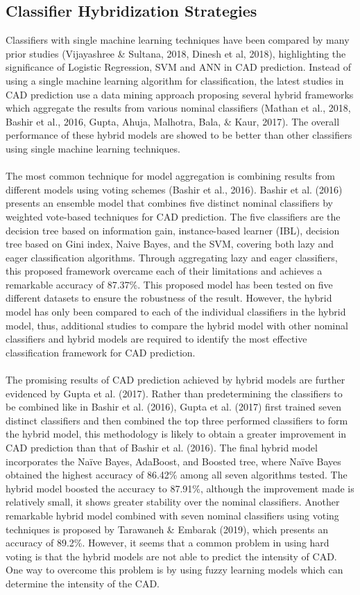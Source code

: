 \documentclass[a4paper, 12pt]{article}
\begin{document}
    \subsection{Classifier Hybridization Strategies} \label{Hybrid_strategy}
    Classifiers with single machine learning techniques have been compared by many prior studies (Vijayashree \& Sultana, 2018, Dinesh et al, 2018), highlighting the significance of Logistic Regression, SVM and ANN in CAD prediction. Instead of using a single machine learning algorithm for classification, the latest studies in CAD prediction use a data mining approach proposing several hybrid frameworks which aggregate the results from various nominal classifiers (Mathan et al., 2018, Bashir et al., 2016, Gupta, Ahuja, Malhotra, Bala, \& Kaur, 2017). The overall performance of these hybrid models are showed to be better than other classifiers using single machine learning techniques.
    \\\\
    The most common technique for model aggregation is combining results from different models using voting schemes (Bashir et al., 2016). Bashir et al. (2016) presents an ensemble model that combines five distinct nominal classifiers by weighted vote-based techniques for CAD prediction. The five classifiers are the decision tree based on information gain, instance-based learner (IBL), decision tree based on Gini index, Naive Bayes, and the SVM, covering both lazy and eager classification algorithms. Through aggregating lazy and eager classifiers, this proposed framework overcame each of their limitations and achieves a remarkable accuracy of 87.37\%. This proposed model has been tested on five different datasets to ensure the robustness of the result. However, the hybrid model has only been compared to each of the individual classifiers in the hybrid model, thus, additional studies to compare the hybrid model with other nominal classifiers and hybrid models are required to identify the most effective classification framework for CAD prediction. 
    \\\\
    The promising results of CAD prediction achieved by hybrid models are further evidenced by Gupta et al. (2017). Rather than predetermining the classifiers to be combined like in Bashir et al. (2016), Gupta et al. (2017) first trained seven distinct classifiers and then combined the top three performed classifiers to form the hybrid model, this methodology is likely to obtain a greater improvement in CAD prediction than that of Bashir et al. (2016). The final hybrid model incorporates the Naïve Bayes, AdaBoost, and Boosted tree, where Naïve Bayes obtained the highest accuracy of 86.42\% among all seven algorithms tested. The hybrid model boosted the accuracy to 87.91\%, although the improvement made is relatively small, it shows greater stability over the nominal classifiers. Another remarkable hybrid model combined with seven nominal classifiers using voting techniques is proposed by Tarawaneh \& Embarak (2019), which presents an accuracy of 89.2\%. However, it seems that a common problem in using hard voting is that the hybrid models are not able to predict the intensity of CAD. One way to overcome this problem is by using fuzzy learning models which can determine the intensity of the CAD.
\end{document}
